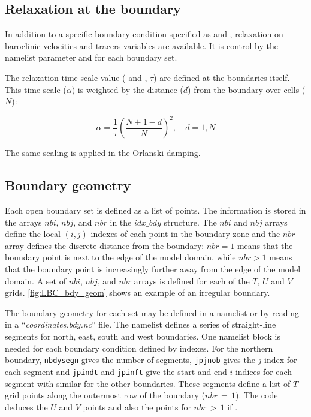 \documentclass[../main/NEMO_manual]{subfiles}
\begin{document}
\subsection{Relaxation at the boundary}
\label{subsec:LBC_bdy_relaxation}

In addition to a specific boundary condition specified as  and , relaxation on baroclinic velocities and tracers variables are available.
It is control by the namelist parameter  and  for each boundary set.

The relaxation time scale value ( and , $\tau$) are defined at the boundaries itself.
This time scale ($\alpha$) is weighted by the distance ($d$) from the boundary over  cells ($N$):

\[
  \alpha = \frac{1}{\tau}(\frac{N+1-d}{N})^2,       \quad d=1,N
\]

The same scaling is applied in the Orlanski damping.

\subsection{Boundary geometry}
\label{subsec:LBC_bdy_geometry}

Each open boundary set is defined as a list of points.
The information is stored in the arrays $nbi$, $nbj$, and $nbr$ in the $idx\_bdy$ structure.
The $nbi$ and $nbj$ arrays define the local $(i,j)$ indexes of each point in the boundary zone and
the $nbr$ array defines the discrete distance from the boundary: $nbr=1$ means that
the boundary point is next to the edge of the model domain, while $nbr>1$ means that
the boundary point is increasingly further away from the edge of the model domain.
A set of $nbi$, $nbj$, and $nbr$ arrays is defined for each of the $T$, $U$ and $V$ grids.
\autoref{fig:LBC_bdy_geom} shows an example of an irregular boundary.

The boundary geometry for each set may be defined in a namelist  or
by reading in a ``\textit{coordinates.bdy.nc}'' file.
The  namelist defines a series of straight-line segments for north, east, south and west boundaries.
One  namelist block is needed for each boundary condition defined by indexes.
For the northern boundary, \texttt{nbdysegn} gives the number of segments,
\texttt{jpjnob} gives the $j$ index for each segment and \texttt{jpindt} and
\texttt{jpinft} give the start and end $i$ indices for each segment with similar for the other boundaries.
These segments define a list of $T$ grid points along the outermost row of the boundary ($nbr\,=\, 1$).
The code deduces the $U$ and $V$ points and also the points for $nbr\,>\, 1$ if .
\end{document}
